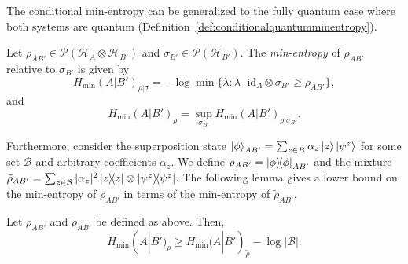 
The conditional min-entropy can be generalized to the fully quantum case where both systems are quantum (Definition~\ref{def:conditionalquantumminentropy}).

\begin{definition}
\label{def:conditionalquantumminentropy}
Let $\rho_{A B'} \in \mathcal{P}(\mathcal{H}_A \otimes \mathcal{H}_{B'})$ and $\sigma_{B'} \in \mathcal{P}(\mathcal{H}_{B'})$. The \textit{min-entropy} of $\rho_{A B'}$ relative to $\sigma_{B'}$ is given by
$$H_{\text{min}}(A | B')_{\rho|\sigma} = -\log \min\{ \lambda : \lambda \cdot \text{id}_A \otimes \sigma_{B'} \geq \rho_{A B'} \},$$
and 
$$ H_{\text{min}}(A | B')_{\rho} = \sup_{\sigma_{B'}} H_{\text{min}}(A | B')_{\rho|\sigma_{B'}}.$$
\end{definition}

Furthermore, consider the superposition state $\ket{\phi}_{AB'} = \sum_{z\in B}\alpha_z\ket{z} \ket{\psi^z}$ for some set $\mathcal{B}$ and arbitrary coefficients $\alpha_z$. We define $\rho_{AB'} = \ketbra{\phi}_{AB'}$ and the mixture $\tilde{\rho}_{AB'} = \sum_{z\in \mathcal{B}} |\alpha_z|^2 \ketbra{z} \otimes \ketbra{\psi^z}$. The following lemma gives a lower bound on the min-entropy of $\rho_{AB'}$ in terms of the min-entropy of $\tilde{\rho}_{AB'} $.


\begin{lemma}
Let $\rho_{AB'}$ and $\tilde{\rho}_{AB'}$ be defined as above. Then,
$$H_{\text{min}}(A | B')_{\rho} \geq H_{\text{min}}(A | B')_{\tilde{\rho}} - \log |\mathcal{B}|.$$
\label{lemma:renner_lower_bound}
\end{lemma}

